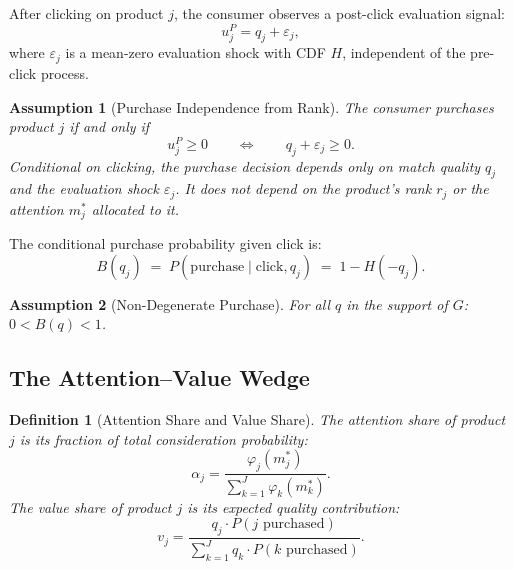\documentclass[12pt]{article}
\newtheorem{assumption}{Assumption}
\newtheorem{definition}{Definition}
\begin{document}
After clicking on product $j$, the consumer observes a post-click evaluation signal:
\begin{equation}\label{eq:post_click}
    u_j^P = q_j + \varepsilon_j,
\end{equation}
where $\varepsilon_j$ is a mean-zero evaluation shock with CDF $H$, independent of the pre-click process.

\begin{assumption}[Purchase Independence from Rank]\label{a:purchase}
The consumer purchases product $j$ if and only if
\begin{equation}\label{eq:purchase_rule}
    u_j^P \geq 0 \qquad \Longleftrightarrow \qquad q_j + \varepsilon_j \geq 0.
\end{equation}
Conditional on clicking, the purchase decision depends only on match quality $q_j$ and the evaluation shock $\varepsilon_j$. It does not depend on the product's rank $r_j$ or the attention $m_j^*$ allocated to it.
\end{assumption}

The conditional purchase probability given click is:
\begin{equation}\label{eq:purchase_prob}
    B(q_j) \;=\; P(\text{purchase} \mid \text{click}, q_j) \;=\; 1 - H(-q_j).
\end{equation}

\begin{assumption}[Non-Degenerate Purchase]\label{a:nondegen}
For all $q$ in the support of $G$: $0 < B(q) < 1$.
\end{assumption}

\subsection{The Attention--Value Wedge}\label{sec:wedge}

\begin{definition}[Attention Share and Value Share]\label{def:shares}
The \emph{attention share} of product $j$ is its fraction of total consideration probability:
\begin{equation}\label{eq:attention_share}
    \alpha_j = \frac{\varphi_j(m_j^*)}{\sum_{k=1}^{J} \varphi_k(m_k^*)}.
\end{equation}
The \emph{value share} of product $j$ is its expected quality contribution:
\begin{equation}\label{eq:value_share}
    v_j = \frac{q_j \cdot P(j \text{ purchased})}{\sum_{k=1}^{J} q_k \cdot P(k \text{ purchased})}.
\end{equation}
\end{definition}
\end{document}
